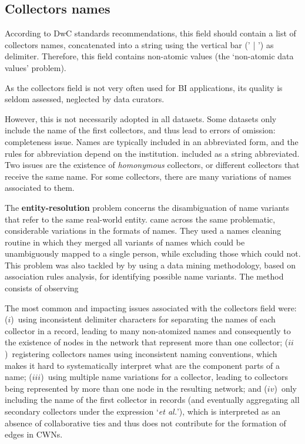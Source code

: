 \subsection{Collectors names}
According to DwC standards recommendations, this field should contain a list of collectors names, concatenated into a string using the vertical bar (' | ') as delimiter.
Therefore, this field contains non-atomic values (the `non-atomic data values' problem).

As the collectors field is not very often used for BI applications, its quality is seldom assessed, neglected by data curators.


However, this is not necessarily adopted in all datasets.
Some datasets only include the name of the first collectors, and thus lead to errors of omission: completeness issue.
Names are typically included in an abbreviated form, and the rules for abbreviation depend on the institution.
included as a string abbreviated.
Two issues are the existence of \textit{homonymous} collectors, or different collectors that receive the same name.
For some collectors, there are many variations of names associated to them.

The \textbf{entity-resolution} problem concerns the disambiguation of name variants that refer to the same real-world entity.
 came across the same problematic, considerable variations in the formats of names.
They used a names cleaning routine in which they merged all variants of names which could be unambiguously mapped to a single person, while excluding those which could not.
This problem was also tackled by  by using a data mining methodology, based on association rules analysis, for identifying possible name variants.
The method consists of observing 

\cite{Bhattacharya2007}

The most common and impacting issues associated with the collectors field were: 
($i$)~using inconsistent delimiter characters for separating the names of each collector in a record, leading to many non-atomized names and consequently to the existence of nodes in the network that represent more than one collector; 
($ii$)~registering collectors names using inconsistent naming conventions, which makes it hard to systematically interpret what are the component parts of a name; 
($iii$)~using multiple name variations for a collector, leading to collectors being represented by more than one node in the resulting network; and 
($iv$)~only including the name of the first collector in records (and eventually aggregating all secondary collectors under the expression `\textit{et al.}'), which is interpreted as an absence of collaborative ties and thus does not contribute for the formation of edges in CWNs.




